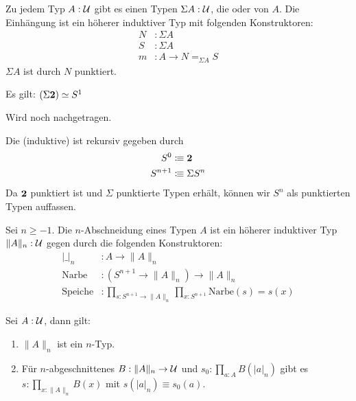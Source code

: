 \begin{regeln}[Einhängung]
  Zu jedem Typ $A:\mathcal{U}$ gibt es einen Typen $\Sigma A:\mathcal{U}$, die  oder  von $A$.
  Die Einhängung ist ein höherer induktiver Typ mit folgenden Konstruktoren:
  \begin{align*}
    N&:\Sigma A \\
    S&:\Sigma A \\
    m&:A\to N=_{\Sigma A}S
  \end{align*}
  $\Sigma A$ ist durch $N$ punktiert.
\end{regeln}

\begin{bemerkung}
  Es gilt: $(\Sigma\mathbf{2})\simeq S^1$
\end{bemerkung}
\begin{beweis}
  Wird noch nachgetragen.
\end{beweis}

\begin{definition}
  Die (induktive)  ist rekursiv gegeben durch
  \begin{align*}
    S^0&\vcentcolon\mspace{-1.2mu}\equiv \mathbf{2} \\
    S^{n+1}&\vcentcolon\mspace{-1.2mu}\equiv \Sigma S^n
  \end{align*}
  Da $\mathbf{2}$ punktiert ist und $\Sigma$ punktierte Typen erhält, können wir $S^n$ als punktierten Typen auffassen.
\end{definition}

\begin{regeln}
  Sei $n\geq -1$.
  Die $n$-Abschneidung eines Typen $A$ ist ein höherer induktiver Typ $\|A\|_n:\mathcal{U}$ gegen durch die folgenden Konstruktoren:
  \begin{align*}
    |\_|_n&:A\to \|A\|_n \\
    \mathrm{Narbe}&:(S^{n+1}\to \|A\|_n)\to \|A\|_n \\
    \mathrm{Speiche}&:\prod_ {s:S^{n+1}\to \|A\|_n}\prod_{x:S^{n+1}} \mathrm{Narbe}(s)=s(x)
  \end{align*}
\end{regeln}

\begin{theorem}
  \label{thm:n-truncation}
  Sei $A:\mathcal{U}$, dann gilt:
  \begin{enumerate}
  \item $\|A\|_n$ ist ein $n$-Typ.
  \item Für $n$-abgeschnittenes $B:\|A\|_n\to\mathcal{U}$ und $s_0:\prod_{a:A}B(|a|_n)$ gibt es $s:\prod_{x:\|A\|_n}B(x)$ mit $s(|a|_n)\equiv s_0(a)$.
  \end{enumerate}
\end{theorem}

